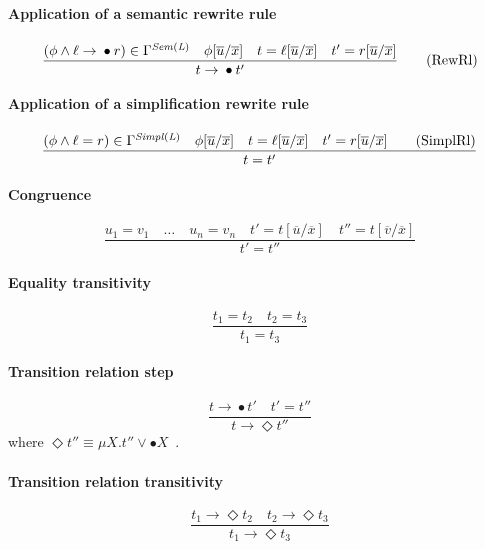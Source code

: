 \documentclass{article}
\theoremstyle{plain}
\theoremstyle{definition}
\begin{document}
\paragraph{Application of a semantic rewrite rule}


\[
\dfrac
{
(\phi \land \ell \rightarrow {}\bullet{} r) \in \Gamma^{\it Sem(L)}\quad  \phi[\overline{u}/\overline{x}] \quad t = \ell[\overline{u}/\overline{x}]\quad t' = r[\overline{u}/\overline{x}]
}
{t \rightarrow {}\bullet{} t'} \tag{RewRl}\label{eq:RewRl}
\]

\paragraph{Application of a simplification rewrite rule}

\[
\dfrac{
(\phi \land \ell = r) \in \Gamma^{\it Simpl(L)}\quad \phi[\overline{u}/\overline{x}] \quad t = \ell[\overline{u}/\overline{x}]\quad t' = r[\overline{u}/\overline{x}] \tag{SimplRl}\label{eq:SimplRl}
}
{t = t'}
\]

\paragraph{Congruence}

\[
\dfrac
{u_1=v_1\quad \ldots\quad u_n=v_n\quad t'=t[\overline{u}/\overline{x}]\quad t''=t[\overline{v}/\overline{x}]}
{t' = t''} \tag{Congr}\label{eq:Congr}
\]

\paragraph{Equality transitivity}

\[
\dfrac
{t_1 = t_{2}\quad t_{2}  = t_{3}}{t_1 = t_{3}} \tag{EqTrans}\label{eq:EqTrans}
\]

\paragraph{Transition relation step}
\[
\dfrac
{t \rightarrow {}\bullet{} t'\quad t' = t''}
{t \rightarrow \Diamond t''} \tag{TrRelStep}\label{eq:TrRelStep}
\]
where $\Diamond t'' \equiv \mu X. t'' \lor \bullet X$~\cite{CR19}.


\paragraph{Transition relation transitivity}

\[
\dfrac
{t_1  \rightarrow \Diamond t_{2}\quad t_{2}  \rightarrow \Diamond t_{3}}
{t_1  \rightarrow \Diamond t_{3}} \tag{TrRelTrans}\label{eq:TrRelTrans}
\]
\end{document}
